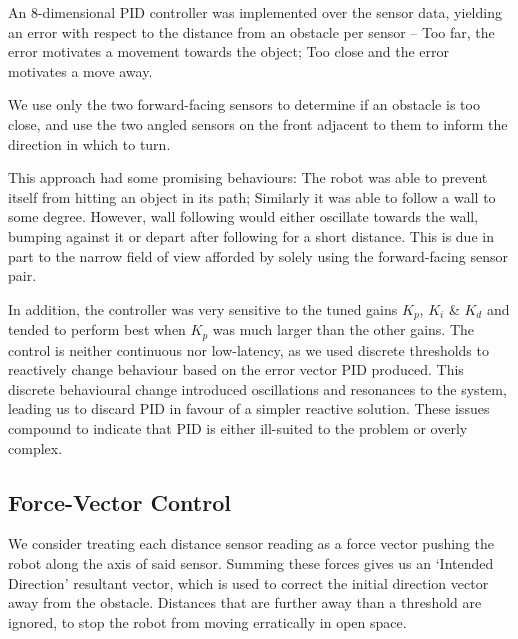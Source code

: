 \documentclass[11pt, a4paper]{article}
\begin{document}
An 8-dimensional PID controller was implemented over the sensor data, yielding an error 
with respect to the distance from an obstacle per sensor -- Too far, the error motivates 
a movement towards the object; Too close and the error motivates a move away.

We use only the two forward-facing sensors to determine if an obstacle is too close, 
and use the two angled sensors on the front adjacent to them to inform the direction in 
which to turn.

This approach had some promising behaviours: The robot was able to prevent itself 
from hitting an object in its path; Similarly it was able to follow a wall to some degree. 
However, wall following would either oscillate towards the wall, bumping against it or 
depart after following for a short distance. This is due in part to the narrow field 
of view afforded by solely using the forward-facing sensor pair.

In addition, the controller was very sensitive to the tuned gains ${K_p}$, ${K_i}$ \&
${K_d}$ and tended to perform best when ${K_p}$ was much larger than the other gains.
The control is neither continuous nor low-latency, as we used discrete thresholds to 
reactively change behaviour based on the error vector PID produced. This discrete 
behavioural change introduced oscillations and resonances to the system, leading us 
to discard PID in favour of a simpler reactive solution. These issues compound to 
indicate that PID is either ill-suited to the problem or overly complex.



\subsection{Force-Vector Control}

We consider treating each distance sensor reading as a force vector pushing 
the robot along the axis of said sensor. Summing these forces gives us an 
`Intended Direction' resultant vector, which is used to correct the initial 
direction vector away from the obstacle. Distances that are further away than
 a threshold are ignored, to stop the robot from moving erratically in open space.
\end{document}

